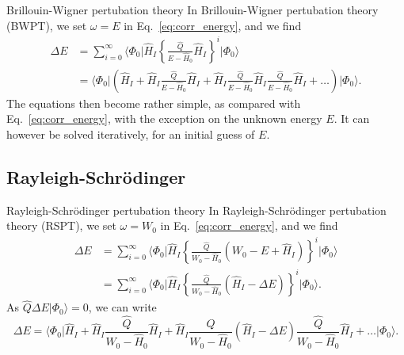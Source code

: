 \documentclass[UKenglish,aspectratio=169]{beamer}
\begin{document}
\begin{frame}{Brillouin-Wigner pertubation theory}
    In Brillouin-Wigner pertubation theory (BWPT), we set $\omega = E$ in Eq.~\eqref{eq:corr_energy}, and we find
    \begin{equation}
        \begin{split}
            \Delta E &= \sum_{i = 0}^\infty \Big\langle \Phi_0 \big\vert \hat{H}_I \left\{
                \frac{\hat{Q}}{E - \hat{H}_0} \hat{H}_I
            \right\}^{i} \big\lvert \Phi_0 \Big\rangle \\
            &= \Big\langle \Phi_0 \vert \left( \hat{H}_I + \hat{H}_I \frac{\hat{Q}}{E - \hat{H}_0} \hat{H}_I + \hat{H}_I \frac{\hat{Q}}{E - \hat{H}_0} \hat{H}_I \frac{\hat{Q}}{E - \hat{H}_0} \hat{H}_I + \ldots \right) \big\lvert \Phi_0 \Big\rangle.
        \end{split}
    \end{equation}
    The equations then become rather simple, as compared with Eq.~\eqref{eq:corr_energy}, with the exception on the unknown energy $E$.
    It can however be solved iteratively, for an initial guess of $E$.
\end{frame}

\subsection{Rayleigh-Schrödinger}

\begin{frame}{Rayleigh-Schrödinger pertubation theory}
    In Rayleigh-Schrödinger pertubation theory (RSPT), we set $\omega = W_0$ in Eq.~\eqref{eq:corr_energy}, and we find
    \begin{equation}
        \begin{split}
            \Delta E &= \sum_{i = 0}^\infty \Big\langle \Phi_0 \big\vert \hat{H}_I \left\{
                \frac{\hat{Q}}{W_0 - \hat{H}_0} \left( W_0 - E + \hat{H}_I \right)
            \right\}^{i} \big\lvert \Phi_0 \Big\rangle \\
            &= \sum_{i = 0}^\infty \Big\langle \Phi_0 \big\vert \hat{H}_I \left\{
                \frac{\hat{Q}}{W_0 - \hat{H}_0} \left( \hat{H}_I - \Delta E \right)
            \right\}^{i} \big\lvert \Phi_0 \Big\rangle.
        \end{split}
    \end{equation}
    As $\hat{Q} \Delta E \vert \Phi_0 \rangle = 0$, we can write
    \begin{equation}\label{eq:RSPT}
        \Delta E = \Big\langle \Phi_0 \big\vert
        \hat{H}_I
        + \hat{H}_I \frac{\hat{Q}}{W_0 - \hat{H}_0} \hat{H}_I
        + \hat{H}_I \frac{\hat{Q}}{W_0 - \hat{H}_0} \left( \hat{H}_I - \Delta E \right) \frac{\hat{Q}}{W_0 - \hat{H}_0} \hat{H}_I
        + \ldots
        \big\vert \Phi_0 \Big\rangle.
    \end{equation}
\end{frame}
\end{document}
